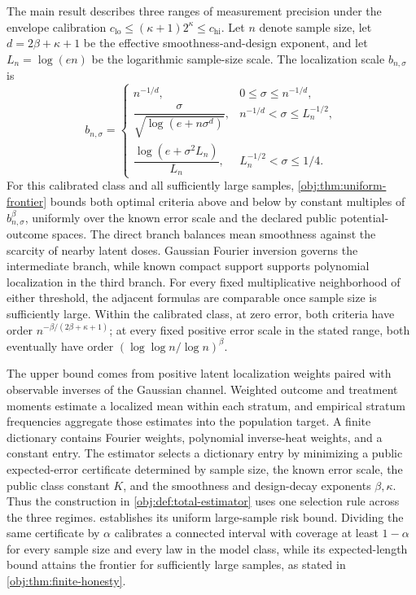 \documentclass[11pt]{article}
\begin{document}
The main result describes three ranges of measurement precision under the envelope calibration \(c_{\mathrm{lo}}\le(\kappa+1)2^\kappa\le c_{\mathrm{hi}}\). Let \(n\) denote sample size, let \(d=2\beta+\kappa+1\) be the effective smoothness-and-design exponent, and let \(L_n=\log(en)\) be the logarithmic sample-size scale. The localization scale \(b_{n,\sigma}\) is
\[
b_{n,\sigma}=
\begin{cases}
n^{-1/d},
&0\le\sigma\le n^{-1/d},\\[3pt]
\dfrac{\sigma}{\sqrt{\log(e+n\sigma^d)}},
&n^{-1/d}<\sigma\le L_n^{-1/2},\\[7pt]
\dfrac{\log(e+\sigma^2L_n)}{L_n},
&L_n^{-1/2}<\sigma\le1/4.
\end{cases}
\]
For this calibrated class and all sufficiently large samples, \cref{obj:thm:uniform-frontier} bounds both optimal criteria above and below by constant multiples of \(b_{n,\sigma}^{\beta}\), uniformly over the known error scale and the declared public potential-outcome spaces. The direct branch balances mean smoothness against the scarcity of nearby latent doses. Gaussian Fourier inversion governs the intermediate branch, while known compact support supports polynomial localization in the third branch. For every fixed multiplicative neighborhood of either threshold, the adjacent formulas are comparable once sample size is sufficiently large. Within the calibrated class, at zero error, both criteria have order \(n^{-\beta/(2\beta+\kappa+1)}\); at every fixed positive error scale in the stated range, both eventually have order \((\log\log n/\log n)^\beta\).

The upper bound comes from positive latent localization weights paired with observable inverses of the Gaussian channel. Weighted outcome and treatment moments estimate a localized mean within each stratum, and empirical stratum frequencies aggregate those estimates into the population target. A finite dictionary contains Fourier weights, polynomial inverse-heat weights, and a constant entry. The estimator selects a dictionary entry by minimizing a public expected-error certificate determined by sample size, the known error scale, the public class constant \(K\), and the smoothness and design-decay exponents \(\beta,\kappa\). Thus the construction in \cref{obj:def:total-estimator} uses one selection rule across the three regimes.  establishes its uniform large-sample risk bound. Dividing the same certificate by \(\alpha\) calibrates a connected interval with coverage at least \(1-\alpha\) for every sample size and every law in the model class, while its expected-length bound attains the frontier for sufficiently large samples, as stated in \cref{obj:thm:finite-honesty}.
\end{document}
